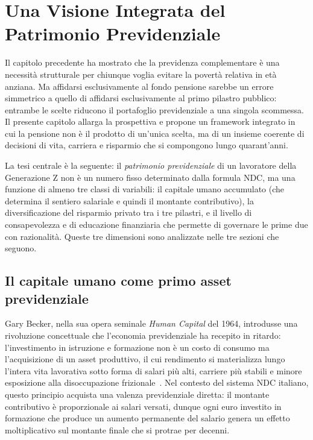 ﻿%
\chapter{Una Visione Integrata del Patrimonio Previdenziale}
\label{cap:patrimonio_integrato}

Il capitolo precedente ha mostrato che la previdenza complementare è una
necessità strutturale per chiunque voglia evitare la povertà relativa in età
anziana. Ma affidarsi esclusivamente al fondo pensione sarebbe un errore
simmetrico a quello di affidarsi esclusivamente al primo pilastro pubblico:
entrambe le scelte riducono il portafoglio previdenziale a una singola
scommessa. Il presente capitolo allarga la prospettiva e propone un
framework integrato in cui la pensione non è il prodotto di un'unica scelta,
ma di un insieme coerente di decisioni di vita, carriera e risparmio che si
compongono lungo quarant'anni.

La tesi centrale è la seguente: il \emph{patrimonio previdenziale} di un
lavoratore della Generazione Z non è un numero fisso determinato dalla
formula NDC, ma una funzione di almeno tre classi di variabili: il capitale
umano accumulato (che determina il sentiero salariale e quindi il montante
contributivo), la diversificazione del risparmio privato tra i tre pilastri, e
il livello di consapevolezza e di educazione finanziaria che permette di
governare le prime due con razionalità. Queste tre dimensioni sono
analizzate nelle tre sezioni che seguono.

\section{Il capitale umano come primo asset previdenziale}
\label{sec:capitale_umano}

Gary Becker, nella sua opera seminale \emph{Human Capital} del 1964,
introdusse una rivoluzione concettuale che l'economia previdenziale ha
recepito in ritardo: l'investimento in istruzione e formazione non è un costo
di consumo ma l'acquisizione di un asset produttivo, il cui rendimento si
materializza lungo l'intera vita lavorativa sotto forma di salari più alti,
carriere più stabili e minore esposizione alla disoccupazione
frizionale~\cite{Becker1964}. Nel contesto del sistema NDC italiano, questo
principio acquista una valenza previdenziale diretta: il montante contributivo
è proporzionale ai salari versati, dunque ogni euro investito in formazione
che produce un aumento permanente del salario genera un effetto moltiplicativo
sul montante finale che si protrae per decenni.

